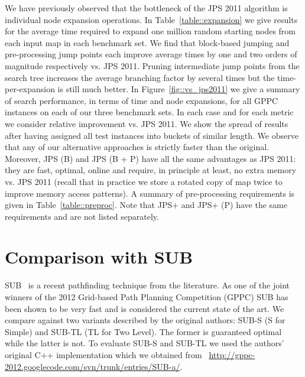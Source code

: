 We have previously observed that the bottleneck of the JPS 2011 algorithm is individual node
expansion operations. In Table~\ref{table::expansion} we give results for the average
time required to expand one million random starting nodes from each input map in
each benchmark set. We find that block-based jumping and pre-processing jump points
each improve average times by one and two orders of magnitude respectively vs. JPS 2011.
Pruning intermediate jump points from the search tree increases the average branching 
factor by several times but the time-per-expansion is still much better. 
In Figure~\ref{fig::vs_jps2011} we give a summary of search performance, in terms
of time and node expansions, for all GPPC instances on each of our three benchmark sets. 
In each case and for each metric we consider relative improvement vs. JPS 2011.
We show the spread of results after having assigned all test instances into buckets of 
similar length.
We observe that any of our alternative approaches is strictly faster than the original. 
Moreover, JPS (B) and JPS (B + P) have all the same advantages as JPS 2011: they are 
fast, optimal, online and require, in principle at least, no extra memory vs. JPS 2011
(recall that in practice we store a rotated copy of map twice to improve memory access
patterns).
A summary of pre-processing requirements is given in Table~\ref{table::preproc}. Note
that JPS+ and JPS+ (P) have the same requirements and are not listed separately.



\section{Comparison with SUB}
SUB~\cite{urasKH13} is a recent pathfinding technique from the literature.
As one of the joint winners of the 2012 Grid-based Path Planning Competition (GPPC) 
SUB has been shown to be very fast and is considered the current state of the art.
We compare against two variants described by the original authors: SUB-S (S
for Simple) and SUB-TL (TL for Two Level). The former is guaranteed optimal
while the latter is not.  To evaluate SUB-S and SUB-TL we used the authors'
original C++ implementation which we obtained from~{\small
\url{http://gppc-2012.googlecode.com/svn/trunk/entries/SUB-a/}}.


